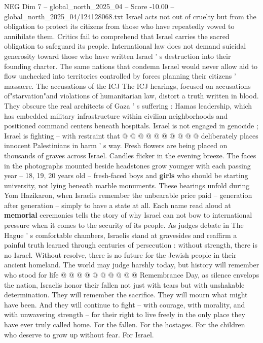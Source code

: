 \begin{textsample}{NEG Dim 7 – global\_north\_2025\_04 – Score -10.00 – global\_north\_2025\_04/124128068.txt}
Israel acts not out of cruelty but from the obligation to protect its citizens from those who have repeatedly vowed to annihilate them.
Critics fail to comprehend that Israel carries the sacred obligation to safeguard its people.
International law does not demand suicidal generosity toward those who have written Israel ' s destruction into their founding charter.
The same nations that condemn Israel would never allow aid to flow unchecked into territories controlled by forces planning their citizens ' massacre.
The accusations of the ICJ The ICJ hearings, focused on accusations of"starvation"and violations of humanitarian law, distort a truth written in blood.
They obscure the real architects of Gaza ' s suffering : Hamas leadership, which has embedded military infrastructure within civilian neighborhoods and positioned command centers beneath hospitals.
Israel is not engaged in genocide ; Israel is fighting -- with restraint that @ @ @ @ @ @ @ @ @ @ deliberately places innocent Palestinians in harm ' s way.
Fresh flowers are being placed on thousands of graves across Israel.
Candles flicker in the evening breeze.
The faces in the photographs mounted beside headstones grow younger with each passing year -- 18, 19, 20 years old -- fresh-faced boys and \textbf{girls} who should be starting university, not lying beneath marble monuments.
These hearings unfold during Yom Hazikaron, when Israelis remember the unbearable price paid -- generation after generation -- simply to have a state at all.
Each name read aloud at \textbf{memorial} ceremonies tells the story of why Israel can not bow to international pressure when it comes to the security of its people.
As judges debate in The Hague ' s comfortable chambers, Israelis stand at gravesides and reaffirm a painful truth learned through centuries of persecution : without strength, there is no Israel.
Without resolve, there is no future for the Jewish people in their ancient homeland.
The world may judge harshly today, but history will remember who stood for life @ @ @ @ @ @ @ @ @ @ Remembrance Day, as silence envelops the nation, Israelis honor their fallen not just with tears but with unshakable determination.
They will remember the sacrifice.
They will mourn what might have been.
And they will continue to fight -- with courage, with morality, and with unwavering strength -- for their right to live freely in the only place they have ever truly called home.
For the fallen.
For the hostages.
For the children who deserve to grow up without fear.
For Israel.

\end{textsample}
